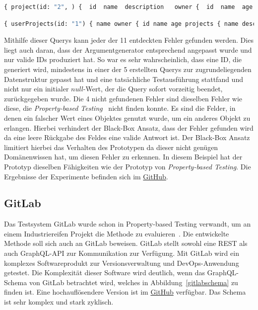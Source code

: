 \begin{lstlisting}[language=GraphQL, caption={Query 1}, label={q1}]
    { project(id: "2", ) {  id  name  description   owner {  id  name  age   }  }  }
\end{lstlisting}

\begin{lstlisting}[language=GraphQL, caption={Query2}, label={q2}]
    { userProjects(id: "1") { name owner { id name age projects { name description id owner { id name age } } } } }
\end{lstlisting}

Mithilfe dieser Querys kann jeder der 11 entdeckten Fehler gefunden werden.
Dies liegt auch daran, dass der Argumentgenerator entsprechend angepasst wurde und nur valide IDs produziert hat.
So war es sehr wahrscheinlich, dass eine ID, die generiert wird, mindestens in einer der 5 erstellten Querys zur zugrundeliegenden Datenstruktur gepasst hat
und eine tatsächliche Testausführung stattfand und nicht nur ein initialer $null$-Wert, der die Query sofort vorzeitig beendet, zurückgegeben wurde.
Die 4 nicht gefundenen Fehler sind dieselben Fehler wie diese, die \textit{Property-based Testing}~\cite[vgl. RQ.2]{property-based-testing} nicht finden konnte.
Es sind die Felder, in denen ein falscher Wert eines Objektes genutzt wurde, um ein anderes Objekt zu erlangen.
Hierbei verhindert der Black-Box Ansatz, dass der Fehler gefunden wird da eine leere Rückgabe des Feldes eine valide Antwort ist.
Der Black-Box Ansatz limitiert hierbei das Verhalten des Prototypen da dieser nicht genügen Domänenwissen hat, um diesen Fehler zu erkennen.
In diesem Beispiel hat der Prototyp dieselben Fähigkeiten wie der Prototyp von \textit{Property-based Testing}.
Die Ergebnisse der Experimente befinden sich im \href{https://github.com/gernhard1337/GraphQL-Testautomatisierung/tree/main/experiment/toy-experiment}{GitHub}.

\subsection{GitLab}

Das Testsystem GitLab wurde schon in Property-based  Testing verwandt, um an einem Industriereifen Projekt die Methode zu evaluieren~\cite[vgl. Experiment]{property-based-testing}.
Die entwickelte Methode soll sich auch an GitLab beweisen.
GitLab stellt sowohl eine REST als auch GraphQL-API zur Kommunikation  zur  Verfügung.
Mit GitLab wird ein komplexes Softwareprodukt zur Versionsverwaltung und DevOps-Anwendung getestet.
Die Komplexität dieser Software wird deutlich, wenn das GraphQL-Schema von GitLab betrachtet wird, welches in Abbildung~\ref{gitlabschema} zu finden ist.
Eine hochauflösendere Version ist im \href{https://github.com/gernhard1337/GraphQL-Testautomatisierung/blob/main/latex/img/gitlabgraph.png}{GitHub} verfügbar.
Das Schema ist sehr komplex und stark zyklisch.

